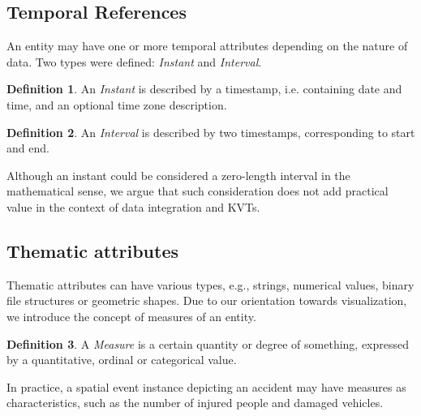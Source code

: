 \documentclass[]{interact}
\theoremstyle{plain}%
\theoremstyle{definition}
\theoremstyle{remark}
\theoremstyle{definition}
\newtheorem{defn}{Definition}[section]
\begin{document}
\subsection{Temporal References}\label{sec:temporalreferences}

An entity may have one or more temporal attributes depending on the nature of data. Two types were defined: \emph{Instant} and \emph{Interval}.

\begin{defn}
	An \emph{Instant} is described by a timestamp, i.e. containing date and time, and an optional time zone description.
\end{defn}

\begin{defn}
	An \emph{Interval} is described by two 
	timestamps, corresponding to start and end.
\end{defn}

Although an instant could be considered a zero-length interval in the mathematical sense, we argue that such consideration does not add practical value in the context of data integration and KVTs.

\subsection{Thematic attributes}\label{sec:thematicattributes}

Thematic attributes can have various types, e.g., strings, numerical values, binary file structures or geometric shapes. Due to our orientation towards visualization, we introduce the concept of measures of an entity.

\begin{defn}
	A \emph{Measure} is a certain quantity or degree of something, expressed by a quantitative, ordinal or categorical value.
\end{defn}

In practice, a spatial event instance depicting an accident may have measures as characteristics, such as the number of injured people and damaged vehicles.

%
%
\end{document}
